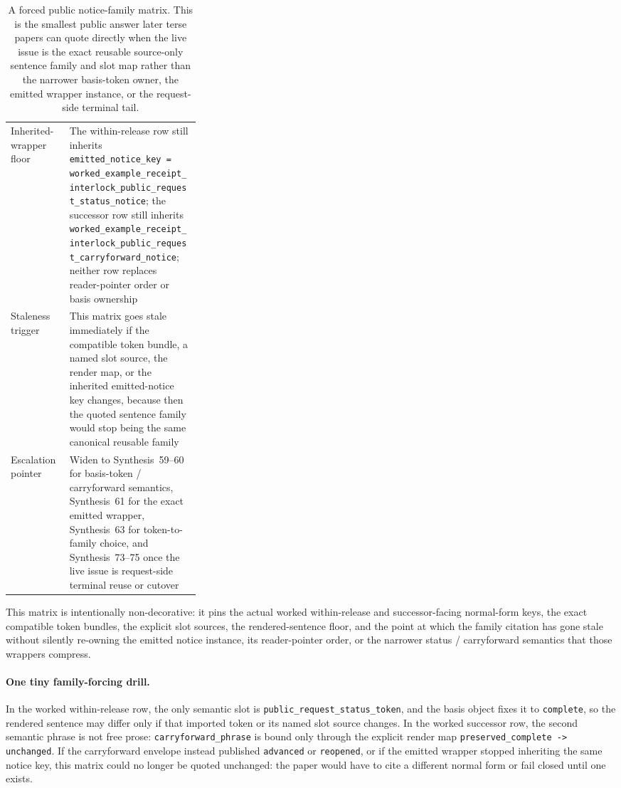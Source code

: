 \documentclass[11pt]{article}
\begin{document}
\begin{table}[t]
\begin{tabularx}{0.97\linewidth}{@{}p{0.31\linewidth}X@{}}
Inherited-wrapper floor & The within-release row still inherits \texttt{emitted\_notice\_key = worked\_example\_receipt\_interlock\_public\_request\_status\_notice}; the successor row still inherits \texttt{worked\_example\_receipt\_interlock\_public\_request\_carryforward\_notice}; neither row replaces reader-pointer order or basis ownership \\
Staleness trigger & This matrix goes stale immediately if the compatible token bundle, a named slot source, the render map, or the inherited emitted-notice key changes, because then the quoted sentence family would stop being the same canonical reusable family \\
Escalation pointer & Widen to Synthesis~59--60 for basis-token / carryforward semantics, Synthesis~61 for the exact emitted wrapper, Synthesis~63 for token-to-family choice, and Synthesis~73--75 once the live issue is request-side terminal reuse or cutover \\
\bottomrule
\end{tabularx}
\caption{A forced public notice-family matrix. This is the smallest public answer later terse papers can quote directly when the live issue is the exact reusable source-only sentence family and slot map rather than the narrower basis-token owner, the emitted wrapper instance, or the request-side terminal tail.}
\label{tab:forced-public-notice-family-matrix}
\end{table}

This matrix is intentionally non-decorative: it pins the actual worked within-release and successor-facing normal-form keys, the exact compatible token bundles, the explicit slot sources, the rendered-sentence floor, and the point at which the family citation has gone stale without silently re-owning the emitted notice instance, its reader-pointer order, or the narrower status / carryforward semantics that those wrappers compress.\cite{series:workedexample}

\paragraph{One tiny family-forcing drill.}
In the worked within-release row, the only semantic slot is \texttt{public\_request\_status\_token}, and the basis object fixes it to \texttt{complete}, so the rendered sentence may differ only if that imported token or its named slot source changes. In the worked successor row, the second semantic phrase is not free prose: \texttt{carryforward\_phrase} is bound only through the explicit render map \texttt{preserved\_complete -> unchanged}. If the carryforward envelope instead published \texttt{advanced} or \texttt{reopened}, or if the emitted wrapper stopped inheriting the same notice key, this matrix could no longer be quoted unchanged: the paper would have to cite a different normal form or fail closed until one exists.\cite{series:workedexample}
\end{document}
